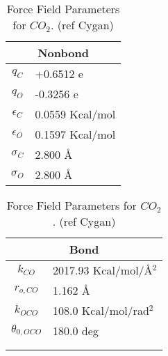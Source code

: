 \documentclass[twoside,english]{uiofysmaster}
\begin{document}
\begin{table}
 \caption{Force Field Parameters for $CO_2$. (ref Cygan)}
 \begin{tabular}[]{|c|l|}
  \hline
  \multicolumn{2}{|c|}{Nonbond} \\ \hline
  $q_C$ & +0.6512 e  \\ \hline
  $q_O$ & -0.3256 e  \\ \hline
  $\epsilon _C$ & 0.0559 Kcal/mol \\ \hline
  $\epsilon _O$ & 0.1597 Kcal/mol \\ \hline
  $\sigma _C$ & 2.800 \AA{} \\ \hline
  $\sigma _O$ & 2.800 \AA{} \\ \hline
 \end{tabular}
  \begin{tabular}[]{|c|l|}
  \hline
  \multicolumn{2}{|c|}{Bond} \\ \hline
  $k_{CO}$ & 2017.93 Kcal/mol/\AA{}$^2$  \\ \hline
  $r_{o,CO}$ & 1.162 \AA{}  \\ \hline
  $k_{OCO}$ & 108.0 Kcal/mol/rad$^2$ \\ \hline
  $\theta _{0,OCO}$ & 180.0 deg \\ \hline
                    &           \\ \hline
                    &           \\ \hline

 \end{tabular}
 \label{ForceFieldParameters_CO2}
\end{table}
\end{document}

